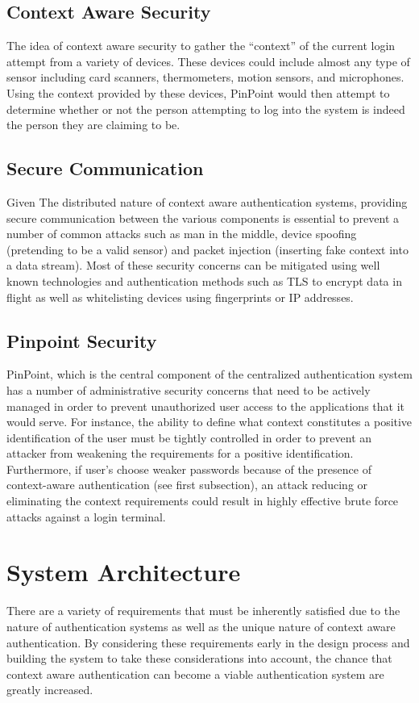 \documentclass[11pt,journal]{IEEEtran}
\begin{document}
\subsection{Context Aware Security}
The idea of context aware security to gather the “context” of the current login attempt from a variety of devices.  These devices could include almost any type of sensor including card scanners, thermometers, motion sensors, and microphones.  Using the context provided by these devices, PinPoint would then attempt to determine whether or not the person attempting to log into the system is indeed the person they are claiming to be.

\subsection{Secure Communication}
Given The distributed nature of context aware authentication systems, providing secure communication between the various components is essential to prevent a number of common attacks such as man in the middle, device spoofing (pretending to be a valid sensor) and packet injection (inserting fake context into a data stream).  Most of these security concerns can be mitigated using well known technologies and authentication methods such as TLS to encrypt data in flight as well as whitelisting devices using fingerprints or IP addresses.

\subsection{Pinpoint Security}
PinPoint, which is the central component of the centralized authentication system has a number of administrative security concerns that need to be actively managed in order to prevent unauthorized user access to the applications that it would serve.  For instance, the ability to define what context constitutes a positive identification of the user must be tightly controlled in order to prevent an attacker from weakening the requirements for a positive identification.  Furthermore, if user's choose weaker passwords because of the presence of context-aware authentication (see first subsection), an attack reducing or eliminating the context requirements could result in highly effective brute force attacks against a login terminal. 

\section{System Architecture}
There are a variety of requirements that must be inherently satisfied due to the nature of authentication systems as well as the unique nature of context aware authentication.  By considering these requirements early in the design process and building the system to take these considerations into account, the chance that context aware authentication can become a viable authentication system are greatly increased.
\end{document}
